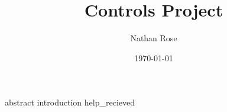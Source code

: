 \documentclass[11pt]{article}
\title{Controls Project}
\author{Nathan Rose}
\date{\today}
\begin{document}
\maketitle
{abstract}
{introduction}
{help_recieved}
\end{document}
